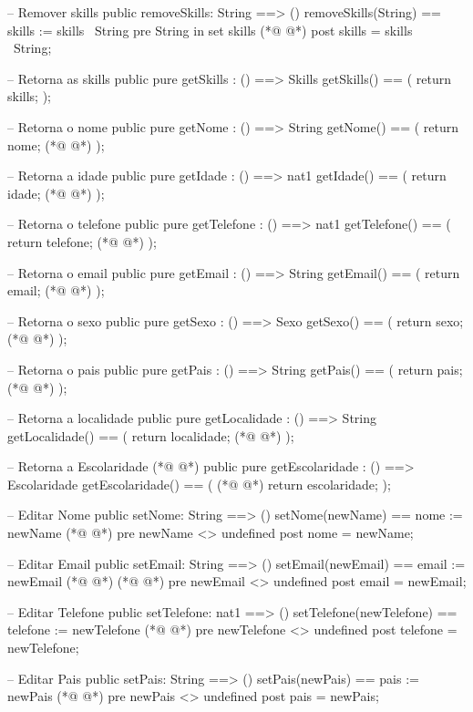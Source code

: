 \begin{vdmpp}[breaklines=true]
 -- Remover skills
 public removeSkills: String ==> ()
 removeSkills(String) == skills := skills \ {String}
 pre String in set skills
(*@
\label{getSkills:81}
@*)
 post skills = skills~ \ {String};
 
 -- Retorna as skills
 public pure getSkills : () ==> Skills
 getSkills() ==
 (
  return skills;
 );
 
 -- Retorna o nome
 public pure getNome : () ==> String
 getNome() ==
 (
  return nome;
(*@
\label{getIdade:95}
@*)
 );
 
 -- Retorna a idade
 public pure getIdade : () ==> nat1
 getIdade() ==
 (
  return idade;
(*@
\label{getTelefone:102}
@*)
 );
 
 -- Retorna o telefone
 public pure getTelefone : () ==> nat1
 getTelefone() ==
 (
  return telefone;
(*@
\label{getEmail:109}
@*)
 );
 
 -- Retorna o email
 public pure getEmail : () ==> String
 getEmail() ==
 (
  return email;
(*@
\label{getSexo:116}
@*)
 );
 
 -- Retorna o sexo
 public pure getSexo : () ==> Sexo
 getSexo() ==
 (
  return sexo;
(*@
\label{getPais:123}
@*)
 );
 
 -- Retorna o pais
 public pure getPais : () ==> String
 getPais() ==
 (
  return pais;
(*@
\label{getLocalidade:130}
@*)
 );
 
 -- Retorna a localidade
 public pure getLocalidade : () ==> String
 getLocalidade() ==
 (
  return localidade;
(*@
\label{setNome:137}
@*)
 );
 
 -- Retorna a Escolaridade
(*@
\label{getEscolaridade:140}
@*)
 public pure getEscolaridade : () ==> Escolaridade
 getEscolaridade() ==
 (
(*@
\label{setEmail:143}
@*)
  return escolaridade;
 );
 
 -- Editar Nome
 public setNome: String ==> ()
 setNome(newName) == nome := newName
(*@
\label{setTelefone:149}
@*)
 pre newName <> undefined
 post nome = newName;
 
 -- Editar Email
 public setEmail: String ==> ()
 setEmail(newEmail) == email := newEmail
(*@
\label{setParis:155}
@*)
(*@
\label{setPais:155}
@*)
 pre newEmail <> undefined
 post email = newEmail;
 
 -- Editar Telefone
 public setTelefone: nat1 ==> ()
 setTelefone(newTelefone) == telefone := newTelefone
(*@
\label{setLocalidade:161}
@*)
 pre newTelefone <> undefined
 post telefone = newTelefone;

 -- Editar Pais
 public setPais: String ==> ()
 setPais(newPais) == pais := newPais
(*@
\label{setEscolaridade:167}
@*)
 pre newPais <> undefined
 post pais = newPais;
 

\end{vdmpp}
